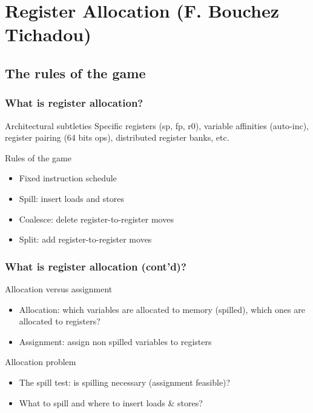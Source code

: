   
\section{Register Allocation (F. Bouchez Tichadou)}

\subsection*{The rules of the game}
\begin{frame}
  \frametitle{What is register allocation?}
   \begin{block}{Architectural subtleties}
        Specific registers (sp, fp, r0), variable affinities (auto-inc), register pairing (64 bits
          ops), distributed register banks, etc.
    \end{block}
   \begin{minipage}{0.7\textwidth}
    \begin{block}{Rules of the game}
      \begin{itemize}
        \item Fixed instruction schedule
        \item \alert{Spill}: insert {\sc loads} and {\sc stores}
        \item \alert{Coalesce}: delete register-to-register {\sc moves}
        \item \alert{Split}: add register-to-register {\sc moves}
      \end{itemize}
    \end{block}
   \end{minipage}
\end{frame}

\begin{frame}
  \frametitle{What is register allocation (cont'd)?}
  \begin{block}{Allocation versus assignment}
    \begin{itemize}
      \item Allocation: which variables are allocated to memory (spilled), which ones are allocated to registers?
      \item Assignment: assign non spilled variables to registers
    \end{itemize}
  \end{block}
  \begin{block}{Allocation problem}
    \begin{itemize}
      \item \alert<3>{The spill test:} is spilling necessary (assignment feasible)?
      \item \alert<2>{What to spill and where to insert loads \& stores?}
    \end{itemize}
  \end{block}
\end{frame}

